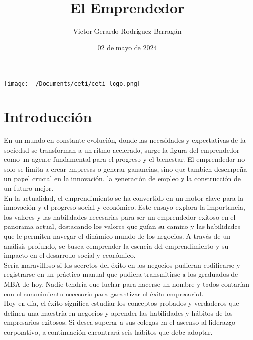 \documentclass{article}
\title{El Emprendedor}
\author{Victor Gerardo Rodríguez Barragán}
\date{02 de mayo de 2024}
\begin{document}
\maketitle
\texttt{[image: ~/Documents/ceti/ceti\_logo.png]}
\newpage
\tableofcontents
\justify
\newpage


\section{Introducción}
En un mundo en constante evolución, donde las necesidades y expectativas de la sociedad se transforman a un ritmo acelerado, surge la figura del emprendedor como un agente fundamental para el progreso y el bienestar. El emprendedor no solo se limita a crear empresas o generar ganancias, sino que también desempeña un papel crucial en la innovación, la generación de empleo y la construcción de un futuro mejor.
\vspace{0.5cm}\\
En la actualidad, el emprendimiento se ha convertido en un motor clave para la innovación y el progreso social y económico.
Este ensayo explora la importancia, los valores y las habilidades necesarias para ser un emprendedor exitoso
en el panorama actual, destacando los valores que guían su camino y las habilidades
que le permiten navegar el dinámico mundo de los negocios. A través de un análisis profundo,
se busca comprender la esencia del emprendimiento y su impacto en el desarrollo social y económico.
\vspace{0.5cm}\\
Sería maravilloso si los secretos del éxito en los negocios pudieran codificarse y registrarse en un práctico manual que pudiera transmitirse a los graduados de MBA de hoy. Nadie tendría que luchar para hacerse un nombre y todos contarían con el conocimiento necesario para garantizar el éxito empresarial.
\vspace{0.5cm}\\
Hoy en día, el éxito significa estudiar los conceptos probados y verdaderos que definen una maestría en negocios y aprender las habilidades y hábitos de los empresarios exitosos. Si desea superar a sus colegas en el ascenso al liderazgo corporativo, a continuación encontrará seis hábitos que debe adoptar.
\end{document}
